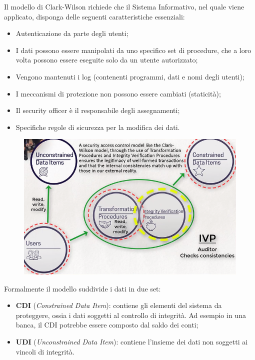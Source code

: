 Il modello di Clark-Wilson richiede che il Sistema Informativo, nel quale viene 
applicato, disponga
delle seguenti caratteristiche essenziali:

\begin{itemize}
      \item Autenticazione da parte degli utenti;
      \item I dati possono essere manipolati da uno specifico set di procedure,
            che a loro volta
            possono essere eseguite solo da un utente autorizzato;
      \item Vengono mantenuti i log (contenenti programmi, dati e nomi degli
            utenti);
      \item I meccanismi di protezione non possono essere cambiati (staticità);
      \item Il security officer è il responsabile degli assegnamenti;
      \item Specifiche regole di sicurezza per la modifica dei dati.
\end{itemize}

\begin{figure}[H]
      \centering
      \includegraphics[width=12cm, keepaspectratio]{capitoli/policy/imgs/clark_wilson3.png}
\end{figure}

Formalmente il modello suddivide i dati in due set:

\begin{itemize}
      \item \textbf{CDI} (\textit{Constrained Data Item}): contiene gli elementi
            del sistema da proteggere, ossia i dati
            soggetti al controllo di integrità. Ad esempio in una banca, il CDI 
            potrebbe essere composto
            dal saldo dei conti;
      \item \textbf{UDI} (\textit{Unconstrained Data Item}): contiene l’insieme
            dei dati non soggetti ai vincoli di
            integrità.
\end{itemize}

